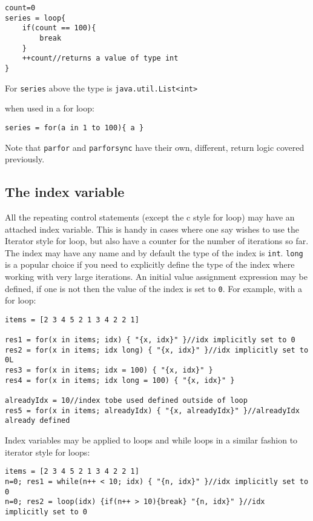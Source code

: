 \documentclass[conc-doc]{subfiles}
\begin{document}
\begin{lstlisting}
count=0
series = loop{
	if(count == 100){
		break
	}
	++count//returns a value of type int
}
\end{lstlisting}

For \lstinline{series} above the type is \lstinline{java.util.List<int>}

when used in a for loop:
\begin{lstlisting}
series = for(a in 1 to 100){ a }
\end{lstlisting}

Note that \lstinline{parfor} and \lstinline{parforsync} have their own, different, return logic covered previously.

\subsection{The index variable}
\label{subsec:indexVar}
All the repeating control statements (except the c style for loop) may have an attached index variable. This is handy in cases where one say wishes to use the Iterator style for loop, but also have a counter for the number of iterations so far. The index may have any name and by default the type of the index is \lstinline{int}. \lstinline{long} is a popular choice if you need to explicitly define the type of the index where working with very large iterations. An initial value assignment expression may be defined, if one is not then the value of the index is set to \lstinline{0}. For example, with a for loop:

\begin{lstlisting}
items = [2 3 4 5 2 1 3 4 2 2 1]

res1 = for(x in items; idx) { "{x, idx}" }//idx implicitly set to 0
res2 = for(x in items; idx long) { "{x, idx}" }//idx implicitly set to 0L
res3 = for(x in items; idx = 100) { "{x, idx}" }
res4 = for(x in items; idx long = 100) { "{x, idx}" }

alreadyIdx = 10//index tobe used defined outside of loop
res5 = for(x in items; alreadyIdx) { "{x, alreadyIdx}" }//alreadyIdx already defined
\end{lstlisting}

Index variables may be applied to loops and while loops in a similar fashion to iterator style for loops:

\begin{lstlisting}
items = [2 3 4 5 2 1 3 4 2 2 1]
n=0; res1 = while(n++ < 10; idx) { "{n, idx}" }//idx implicitly set to 0
n=0; res2 = loop(idx) {if(n++ > 10){break} "{n, idx}" }//idx implicitly set to 0
\end{lstlisting}
\end{document}
